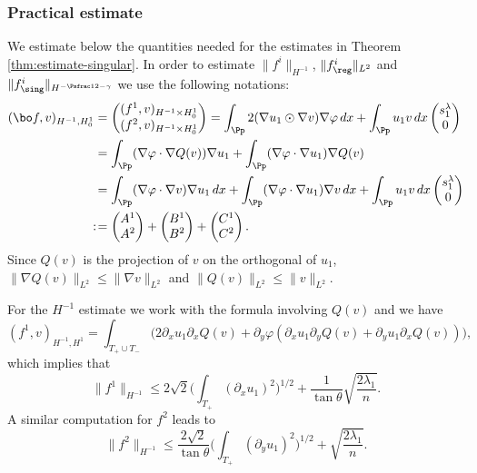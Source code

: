 \subsubsection*{Practical estimate} We estimate below the quantities needed for the estimates in Theorem \ref{thm:estimate-singular}.
In order to estimate $\|f^i\|_{H^{-1}}$, $\|f^i_{\reg}\|_{L^2}$ and $\|f^i_{\sing}\|_{H^{-\Psfrac 12 -\gamma}}$ we use the following notations:
\begin{align*}
(\bo f,v)_{H^{-1},H_0^1}&=\begin{pmatrix} (f^1,v)_{H^{-1}\times H^1_0}\\ (f^2,v)_{H^{-1}\times H^1_0}\end{pmatrix} = \int_{\Pp} 2(\nabla u_1 \odot \nabla v)\nabla \varphi \, dx+ \int_{\Pp} u_1v\, dx \begin{pmatrix} s_1^\lambda\\ 0 \end{pmatrix} \\
&= \int_{\Pp} (\nabla \varphi \cdot \nabla Q(v))\nabla u_1 +\int_\Pp (\nabla \varphi \cdot \nabla u_1)\nabla Q(v)\\
&= \int_{\Pp} (\nabla \varphi \cdot \nabla v)\nabla u_1 \, dx+ \int_{\Pp} (\nabla \varphi \cdot \nabla u_1)\nabla v \, dx+\int_{\Pp} u_1v\, dx \begin{pmatrix} s_1^\lambda\\ 0 \end{pmatrix}\\
:\!&=\begin{pmatrix} A^1\\ A^2 \end{pmatrix}+\begin{pmatrix} B^1\\ B^2 \end{pmatrix}+\begin{pmatrix} C^1\\ C^2 \end{pmatrix}.
\end{align*}
Since $Q(v)$ is the projection of $v$ on the orthogonal of $u_1$, $\|\nabla Q(v)\|_{L^2} \leq \|\nabla v\|_{L^2}$ and $\|Q(v)\|_{L^2} \leq \|v\|_{L^2}$.

For the $H^{-1}$ estimate we work with the formula involving $Q(v)$ and we have
\[
(f^1,v)_{H^{-1},H^1} = \int_{T_+\cup T_-} \bigl(2\partial_x u_1 \partial_x Q(v) + \partial_y \varphi (\partial_x u_1 \partial_y Q(v) + \partial_y u_1 \partial_x Q(v))\bigr),
\]
which implies that
\[
\|f^1\|_{H^{-1}} \leq 2\sqrt{2} \biggl(\int_{T_+}(\partial_x u_1)^2\biggr)^{1/2}+\frac{1}{\tan \theta} \sqrt{\frac{2\lambda_1}{n}}.
\]
A similar computation for $f^2$ leads to
\[
\|f^2\|_{H^{-1}} \leq \frac{2\sqrt{2}}{\tan \theta}\biggl(\int_{T_+}(\partial_y u_1)^2\biggr)^{1/2} +\sqrt{\frac{2\lambda_1}{n}}.
\]

